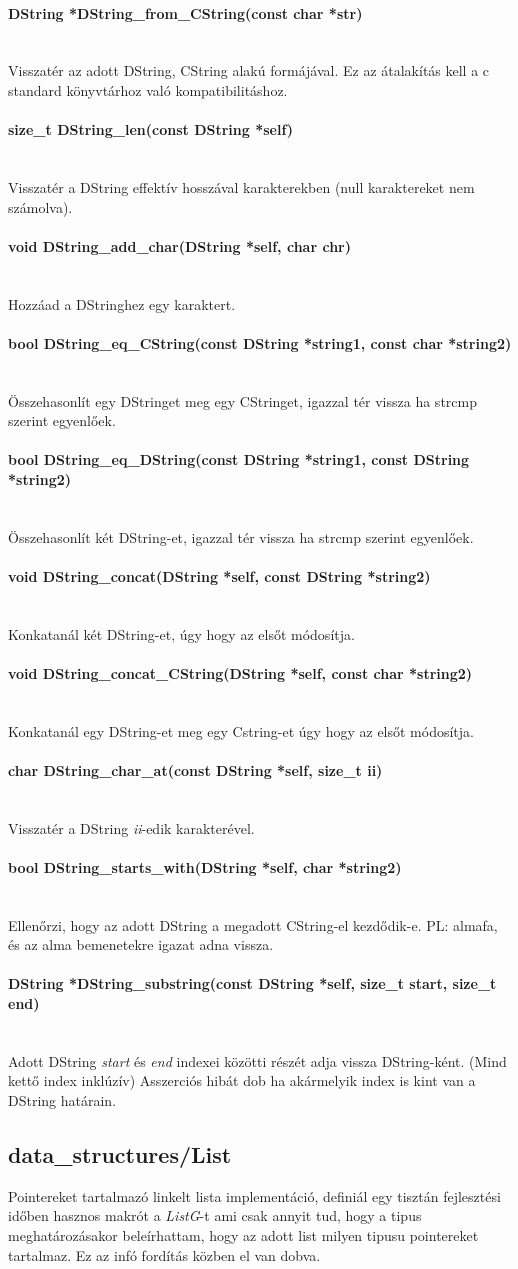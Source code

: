 \documentclass{article}[12pt,a4paper]
\newcommand{\lang}[1]{\textit{#1}}
\newcommand{\fn}[1]{\paragraph{#1}\mbox{}\\}
\begin{document}
    \fn{DString *DString\_from\_CString(const char *str)}
    Visszatér az adott DString, CString alakú formájával.
    Ez az átalakítás kell a c standard könyvtárhoz való kompatibilitáshoz.

    \fn{size\_t DString\_len(const DString *self)}
    Visszatér a DString effektív hosszával karakterekben (null karaktereket nem számolva).

    \fn{void DString\_add\_char(DString *self, char chr)}
    Hozzáad a DStringhez egy karaktert.

    \fn{bool DString\_eq\_CString(const DString *string1, const char *string2)}
    Összehasonlít egy DStringet meg egy CStringet, igazzal tér vissza ha strcmp szerint egyenlőek.

    \fn{bool DString\_eq\_DString(const DString *string1, const DString *string2)}
    Összehasonlít két DString-et, igazzal tér vissza ha strcmp szerint egyenlőek.

    \fn{void DString\_concat(DString *self, const DString *string2)}
    Konkatanál két DString-et, úgy hogy az elsőt módosítja.

    \fn{void DString\_concat\_CString(DString *self, const char *string2)}
    Konkatanál egy DString-et meg egy Cstring-et úgy hogy az elsőt módosítja.

    \fn{char DString\_char\_at(const DString *self, size\_t ii)}
    Visszatér a DString \textit{ii}-edik karakterével.

    \fn{bool DString\_starts\_with(DString *self, char *string2)}
    Ellenőrzi, hogy az adott DString a megadott CString-el kezdődik-e.
    PL: almafa, és az alma bemenetekre igazat adna vissza.

    \fn{DString *DString\_substring(const DString *self, size\_t start, size\_t end)}
    Adott DString \textit{start} és \textit{end} indexei közötti részét adja vissza DString-ként. (Mind kettő index inklúzív)
    Asszerciós hibát dob ha akármelyik index is kint van a DString határain.

    \subsection{data\_structures/List}
    Pointereket tartalmazó linkelt lista implementáció, definiál egy tisztán fejlesztési időben hasznos makrót a \lang{ListG}-t ami csak annyit tud, hogy a tipus meghatározásakor beleírhattam, hogy az adott list milyen tipusu pointereket tartalmaz.
    Ez az infó fordítás közben el van dobva.
\end{document}
